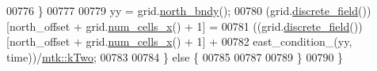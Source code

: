 \begin{DoxyCode}
00776     \}
00777 
00779     yy = grid.\hyperlink{classmtk_1_1UniStgGrid2D_afe1ead253cdeb5503e0489eba8fd84e2}{north\_bndy}();
00780     (grid.\hyperlink{classmtk_1_1UniStgGrid2D_a3e72d59843a3f9c5e47da07e5850dfe0}{discrete\_field}())[north\_offset + grid.\hyperlink{classmtk_1_1UniStgGrid2D_a2d182866a398aba8e4829590e85bf939}{num\_cells\_x}() + 1] =
00781       ((grid.\hyperlink{classmtk_1_1UniStgGrid2D_a3e72d59843a3f9c5e47da07e5850dfe0}{discrete\_field}())[north\_offset + grid.\hyperlink{classmtk_1_1UniStgGrid2D_a2d182866a398aba8e4829590e85bf939}{num\_cells\_x}() + 1] +
00782       east\_condition\_(yy, time))/\hyperlink{group__c01-roots_gaf39c2d851a2db744f4feb1c5ab3ec2cf}{mtk::kTwo};
00783 
00784   \} \textcolor{keywordflow}{else} \{
00785 
00787 
00789   \}
00790 \}
\end{DoxyCode}
